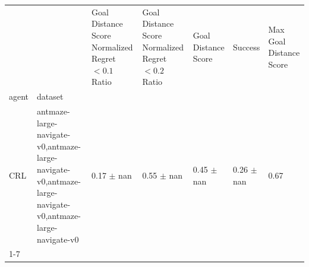 \begin{tabular}{lllllll}
\toprule
 &  & Goal Distance Score Normalized Regret $< 0.1$ Ratio & Goal Distance Score Normalized Regret $< 0.2$ Ratio & Goal Distance Score & Success & Max Goal Distance Score \\
agent & dataset &  &  &  &  &  \\
\midrule
CRL & antmaze-large-navigate-v0,antmaze-large-navigate-v0,antmaze-large-navigate-v0,antmaze-large-navigate-v0 & 0.17 $\pm$ nan & 0.55 $\pm$ nan & 0.45 $\pm$ nan & 0.26 $\pm$ nan & 0.67 \\
\cline{1-7}
\bottomrule
\end{tabular}
